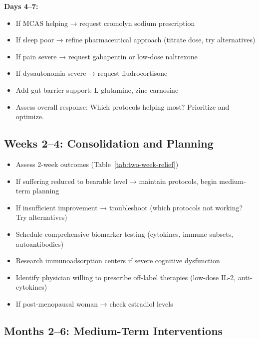 \textbf{Days 4--7:}
\begin{itemize}
    \item[$\square$] If MCAS helping → request cromolyn sodium prescription
    \item[$\square$] If sleep poor → refine pharmaceutical approach (titrate dose, try alternatives)
    \item[$\square$] If pain severe → request gabapentin or low-dose naltrexone
    \item[$\square$] If dysautonomia severe → request fludrocortisone
    \item[$\square$] Add gut barrier support: L-glutamine, zinc carnosine
    \item[$\square$] Assess overall response: Which protocols helping most? Prioritize and optimize.
\end{itemize}

\subsection{Weeks 2--4: Consolidation and Planning}

\begin{itemize}
    \item[$\square$] Assess 2-week outcomes (Table~\ref{tab:two-week-relief})
    \item[$\square$] If suffering reduced to bearable level → maintain protocols, begin medium-term planning
    \item[$\square$] If insufficient improvement → troubleshoot (which protocols not working? Try alternatives)
    \item[$\square$] Schedule comprehensive biomarker testing (cytokines, immune subsets, autoantibodies)
    \item[$\square$] Research immunoadsorption centers if severe cognitive dysfunction
    \item[$\square$] Identify physician willing to prescribe off-label therapies (low-dose IL-2, anti-cytokines)
    \item[$\square$] If post-menopausal woman → check estradiol levels
\end{itemize}

\subsection{Months 2--6: Medium-Term Interventions}

